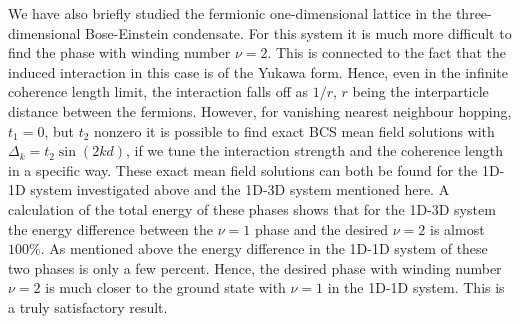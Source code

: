 We have also briefly studied the fermionic one-dimensional lattice in the three-dimensional Bose-Einstein condensate. For this system it is much more difficult to find the phase with winding number $\nu = 2$. This is connected to the fact that the induced interaction in this case is of the Yukawa form. Hence, even in the infinite coherence length limit, the interaction falls off as $1 / r$, $r$ being the interparticle distance between the fermions. However, for vanishing nearest neighbour hopping, $t_1 = 0$, but $t_2$ nonzero it is possible to find exact BCS mean field solutions with $\Delta_k = t_2\sin(2kd)$, if we tune the interaction strength and the coherence length in a specific way. These exact mean field solutions can both be found for the 1D-1D system investigated above and the 1D-3D system mentioned here. A calculation of the total energy of these phases shows that for the 1D-3D system the energy difference between the $\nu = 1$ phase and the desired $\nu = 2$ is almost $100 \%$. As mentioned above the energy difference in the 1D-1D system of these two phases is only a few percent. Hence, the desired phase with winding number $\nu = 2$ is much closer to the ground state with $\nu = 1$ in the 1D-1D system. This is a truly satisfactory result. 



